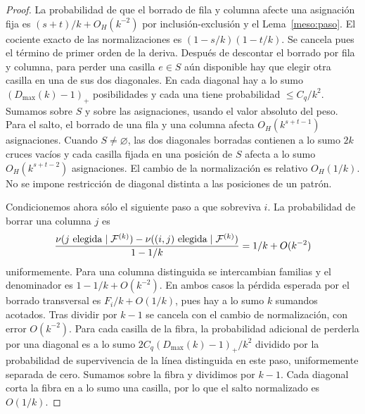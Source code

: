 \begin{proof}
La probabilidad de que el borrado de fila y columna afecte una asignación fija es
$(s+t)/k+O_H(k^{-2})$ por inclusión-exclusión y el Lema~\ref{meso:paso}. El cociente exacto de las
normalizaciones es $(1-s/k)(1-t/k)$. Se cancela pues el término de primer orden de la deriva. Después
de descontar el borrado por fila y columna, para perder una casilla $e\in S$ aún disponible hay que
elegir otra casilla en una de sus dos diagonales. En cada diagonal hay a lo sumo $(D_{\max}(k)-1)_+$
posibilidades y cada una tiene probabilidad $\le C_q/k^2$. Sumamos sobre $S$ y sobre las asignaciones,
usando el valor absoluto del peso. Para el salto, el borrado de una fila y una columna afecta
$O_H(k^{s+t-1})$ asignaciones. Cuando $S\ne\varnothing$, las dos diagonales borradas contienen a lo
sumo $2k$ cruces vacíos y cada casilla fijada en una posición de $S$ afecta a lo sumo
$O_H(k^{s+t-2})$ asignaciones. El cambio de la normalización es relativo $O_H(1/k)$. No se impone
restricción de diagonal distinta a las posiciones de un patrón.

Condicionemos ahora sólo el siguiente paso a que sobreviva $i$. La probabilidad de borrar una columna
$j$ es
\[
 \frac{\nu(j\ {\rm elegida}\mid\mathcal F^{(k)})-
       \nu((i,j)\ {\rm elegida}\mid\mathcal F^{(k)})}{1-1/k}
   =1/k+O(k^{-2})
\]
uniformemente. Para una columna distinguida se intercambian familias y el denominador es
$1-1/k+O(k^{-2})$. En ambos casos la pérdida esperada por el borrado transversal es $F_i/k+O(1/k)$,
pues hay a lo sumo $k$ sumandos acotados. Tras dividir por $k-1$ se cancela con el cambio de
normalización, con error $O(k^{-2})$. Para cada casilla de la fibra, la probabilidad adicional de
perderla por una diagonal es a lo sumo $2C_q(D_{\max}(k)-1)_+/k^2$ dividido por la probabilidad de
supervivencia de la línea
distinguida en este paso, uniformemente separada de cero. Sumamos sobre la fibra y dividimos por
$k-1$. Cada diagonal corta la fibra en a lo sumo una casilla, por lo que el salto normalizado es
$O(1/k)$.
\end{proof}
